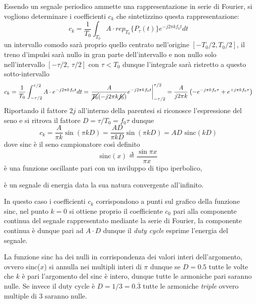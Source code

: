 Essendo un segnale periodico ammette una rappresentazione in serie di Fourier,
si vogliono determinare i coefficienti $c_k$ che sintetizzino questa
rappresentazione:
$$
c_k = \frac{1}{T_0}\int_{T_0} A\cdot rep_{T_0}\{P_\tau(t)\}e^{-j2\pi k f_0 t} dt
$$
un intervallo comodo sarà proprio quello centrato nell'origine $[-T_0/2,
T_0/2]$, il treno d'impulsi sarà nullo in gran parte dell'intervallo e non
nullo solo nell'intervallo $[-\tau/2,\ \tau/2]$ con $\tau<T_0$ dunque
l'integrale sarà ristretto
a questo sotto-intervallo
$$
c_k = \frac{1}{T_0}\int_{-\tau/2}^{\tau/2} A\cdot e^{-j2\pi k f_0 t}dt =
\left.\frac{A}{\cancel{T_0}  (-j2\pi k\cancel{f_0})} e^{-j 2\pi kf_0t}
\right|_{-\tau/2}^{\tau/2} = \frac{A}{j2\pi k } \left( -e^{-j\pi kf_0 \tau} +
e^{+j\pi kf_0 \tau}
\right)
$$
Riportando il fattore $2j$ all'interno della parentesi si riconosce
l'espressione del seno e si ritrova il fattore $D = \tau/T_0 = f_0\tau$
dunque
$$
c_k = \frac{A}{\pi k} \sin(\pi k D) = \frac{AD}{\pi kD} \sin(\pi k D) =  AD
\text{ sinc}(kD)
$$
dove sinc è il seno campionatore così definito
$$
\text{sinc}(x) \stackrel{\Delta}{=} \frac{\sin{\pi x}}{\pi x}
$$
è una funzione oscillante pari con un inviluppo di tipo iperbolico,
\begin{figure}[h]
\centering
{}
\end{figure}
è un segnale di energia data la sua natura convergente all'infinito.

In questo caso i coefficienti $c_k$ corrispondono a punti sul grafico della
funzione sinc, nel punto $k=0$ si ottiene proprio il coefficiente $c_0$ pari
alla componente continua del segnale rappresentato mediante la serie di
Fourier, la componente continua è dunque pari ad $A\cdot D$ dunque il
\textit{duty cycle} esprime l'energia del segnale.

La funzione sinc ha dei
nulli in corrispondenza dei valori interi dell'argomento, ovvero sinc($x$) si
annulla nei multipli interi di $\pi$ dunque se $D = 0.5$ tutte le volte che $k$
è pari l'argomento del sinc è intero, dunque tutte le armoniche pari saranno
nulle.
Se invece il duty cycle è $D=1/3 = 0.\overline{3}$ tutte le armoniche
\textit{triple} ovvero multiple di 3 saranno nulle.

